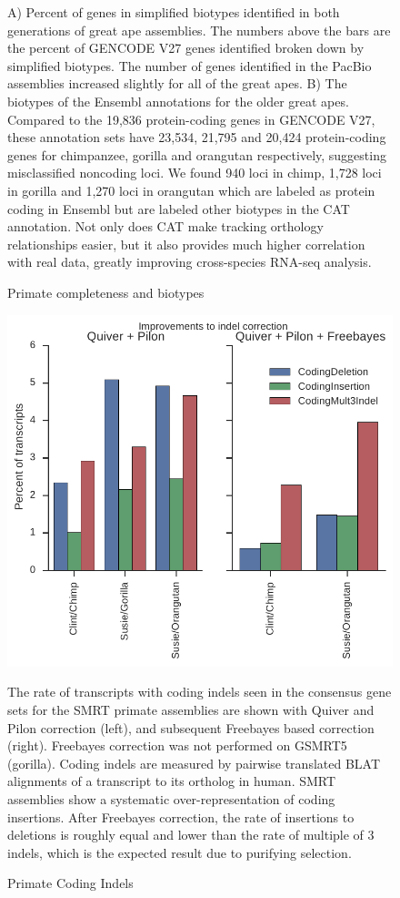 \documentclass[fleqn,10pt]{wlscirep}
\begin{document}
\begin{figure}
\caption{Primate completeness and biotypes}
A) Percent of genes in simplified biotypes identified in both generations of great ape assemblies. The numbers above the bars are the percent of GENCODE V27 genes identified broken down by simplified biotypes. The number of genes identified in the PacBio assemblies increased slightly for all of the great apes. B) The biotypes of the Ensembl annotations for the older great apes. Compared to the 19,836 protein-coding genes in GENCODE V27, these annotation sets have 23,534, 21,795 and 20,424 protein-coding genes for chimpanzee, gorilla and orangutan respectively, suggesting misclassified noncoding loci. We found 940 loci in chimp, 1,728 loci in gorilla and 1,270 loci in orangutan which are labeled as protein coding in Ensembl but are labeled other biotypes in the CAT annotation. Not only does CAT make tracking orthology relationships easier, but it also provides much higher correlation with real data, greatly improving cross-species RNA-seq analysis.
\label{supp_fig:primate_completeness}
\end{figure}

\begin{figure}
\centering
\includegraphics[width=\textwidth,height=\textheight,keepaspectratio]{primate_indels.pdf}
\caption{Primate Coding Indels}
The rate of transcripts with coding indels seen in the consensus gene sets for the SMRT primate assemblies are shown with Quiver and Pilon correction (left), and subsequent Freebayes \cite{garrison2012haplotype} based correction (right). Freebayes correction was not performed on GSMRT5 (gorilla). Coding indels are measured by pairwise translated BLAT alignments of a transcript to its ortholog in human. SMRT assemblies show a systematic over-representation of coding insertions. After Freebayes correction, the rate of insertions to deletions is roughly equal and lower than the rate of multiple of 3 indels, which is the expected result due to purifying selection.
\label{supp_fig:primate_indels}
\end{figure}
\end{document}
